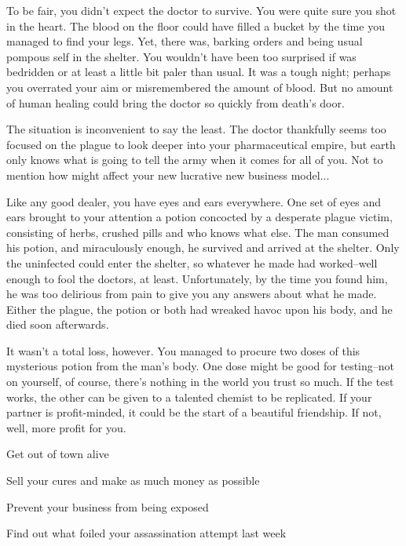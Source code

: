 \documentclass[char]{guildcamp4}
\begin{document}
To be fair, you didn't expect the doctor to survive. You were quite sure you shot \cOutsider{\them} in the heart. The blood on the floor could have filled a bucket by the time you managed to find your legs. Yet, there \cOutsider{\they} was, barking orders and being \cOutsider{\their} usual pompous self in the shelter. You wouldn't have been too surprised if \cOutsider{\they} was bedridden or at least a little bit paler than usual. It was a tough night; perhaps you overrated your aim or misremembered the amount of blood. But no amount of human healing could bring the doctor so quickly from death's door.

The situation is inconvenient to say the least. The doctor thankfully seems too focused on the plague to look deeper into your pharmaceutical empire, but earth only knows what \cOutsider{\they} is going to tell the army when it comes for all of you. Not to mention how \cOutsider{\they} might affect your new lucrative new business model...

Like any good dealer, you have eyes and ears everywhere. One set of eyes and ears brought to your attention a potion concocted by a desperate plague victim, consisting of herbs, crushed pills and who knows what else. The man consumed his potion, and miraculously enough, he survived and arrived at the shelter. Only the uninfected could enter the shelter, so whatever he made had worked--well enough to fool the doctors, at least. Unfortunately, by the time you found him, he was too delirious from pain to give you any answers about what he made. Either the plague, the potion or both had wreaked havoc upon his body, and he died soon afterwards. 

It wasn't a total loss, however. You managed to procure two doses of this mysterious potion from the man's body. One dose might be good for testing--not on yourself, of course, there's nothing in the world you trust so much. If the test works, the other can be given to a talented chemist to be replicated. If your partner is profit-minded, it could be the start of a beautiful friendship. If not, well, more profit for you.

\begin{itemz}[Goals]
	\item Get out of town alive
	\item Sell your cures and make as much money as possible
	\item Prevent your business from being exposed
	\item Find out what foiled your assassination attempt last week
\end{itemz}
\end{document}
